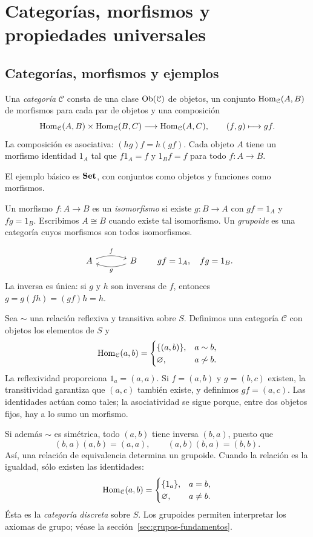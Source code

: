 \section{Categorías, morfismos y propiedades universales}\label{sec:preliminares-categorias}

\subsection{Categorías, morfismos y ejemplos}\label{tema:1-3-1}\label{tema:1-3-2}
\begin{defi}
Una \emph{categoría} $\mathcal C$ consta de una clase $\operatorname{Ob}(\mathcal C)$ de objetos, un conjunto $\operatorname{Hom}_{\mathcal C}(A,B)$ de morfismos para cada par de objetos y una composición
\[
\operatorname{Hom}_{\mathcal C}(A,B)\times\operatorname{Hom}_{\mathcal C}(B,C)
\longrightarrow\operatorname{Hom}_{\mathcal C}(A,C),\qquad(f,g)\longmapsto gf.
\]
La composición es asociativa: $(hg)f=h(gf)$. Cada objeto $A$ tiene un morfismo identidad $1_A$ tal que $f1_A=f$ y $1_Bf=f$ para todo $f:A\to B$.
\end{defi}
El ejemplo básico es $\mathbf{Set}$, con conjuntos como objetos y funciones como morfismos.

\begin{defi}
Un morfismo $f:A\to B$ es un \emph{isomorfismo} si existe $g:B\to A$ con $gf=1_A$ y $fg=1_B$. Escribimos $A\cong B$ cuando existe tal isomorfismo. Un \emph{grupoide} es una categoría cuyos morfismos son todos isomorfismos.
\end{defi}
\[
\begin{tikzcd}[column sep=large]
A\arrow[r,bend left=20,"f"]&B\arrow[l,bend left=20,"g"]
\end{tikzcd}
\qquad gf=1_A,\quad fg=1_B.
\]
La inversa es única: si $g$ y $h$ son inversas de $f$, entonces $g=g(fh)=(gf)h=h$.

Sea $\sim$ una relación reflexiva y transitiva sobre $S$. Definimos una categoría $\mathcal C$ con objetos los elementos de $S$ y
\[
\operatorname{Hom}_{\mathcal C}(a,b)=
\begin{cases}\{(a,b)\},&a\sim b,\\\varnothing,&a\not\sim b.\end{cases}
\]
La reflexividad proporciona $1_a=(a,a)$. Si $f=(a,b)$ y $g=(b,c)$ existen, la transitividad garantiza que $(a,c)$ también existe, y definimos $gf=(a,c)$. Las identidades actúan como tales; la asociatividad se sigue porque, entre dos objetos fijos, hay a lo sumo un morfismo.

Si además $\sim$ es simétrica, todo $(a,b)$ tiene inversa $(b,a)$, puesto que
\[
(b,a)(a,b)=(a,a),\qquad (a,b)(b,a)=(b,b).
\]
Así, una relación de equivalencia determina un grupoide. Cuando la relación es la igualdad, sólo existen las identidades:
\[
\operatorname{Hom}_{\mathcal C}(a,b)=
\begin{cases}\{1_a\},&a=b,\\\varnothing,&a\ne b.\end{cases}
\]
Ésta es la \emph{categoría discreta} sobre $S$. Los grupoides permiten interpretar los axiomas de grupo; véase la sección~\ref{sec:grupos-fundamentos}.

